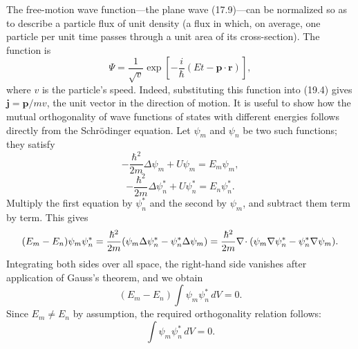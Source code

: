 The free-motion wave function---the plane wave (17.9)---can be normalized so
as to describe a particle flux of unit density (a flux in which, on average,
one particle per unit time passes through a unit area of its cross-section).
The function is
\begin{equation}
  \Psi=\frac{1}{\sqrt v}
  \exp\left[-\frac{i}{\hbar}(Et-\mathbf p\cdot\mathbf r)\right],
  \tag{19.7}
\end{equation}
where $v$ is the particle's speed. Indeed, substituting this function into
(19.4) gives $\mathbf j=\mathbf p/mv$, the unit vector in the direction of
motion.
It is useful to show how the mutual orthogonality of wave functions of states
with different energies follows directly from the Schrödinger equation. Let
$\psi_m$ and $\psi_n$ be two such functions; they satisfy
\[
  -\frac{\hbar^2}{2m}\Delta\psi_m+U\psi_m=E_m\psi_m,
\]
\[
  -\frac{\hbar^2}{2m}\Delta\psi_n^*+U\psi_n^*=E_n\psi_n^*.
\]
Multiply the first equation by $\psi_n^*$ and the second by $\psi_m$, and
subtract them term by term. This gives
\[
  (E_m-E_n)\psi_m\psi_n^*
  =\frac{\hbar^2}{2m}(\psi_m\Delta\psi_n^*-\psi_n^*\Delta\psi_m)
  =\frac{\hbar^2}{2m}\nabla\!\cdot 
  (\psi_m\nabla \psi_n^*-\psi_n^*\nabla \psi_m).
\]
Integrating both sides over all space, the right-hand side vanishes after
application of Gauss's theorem, and we obtain
\[
  (E_m-E_n)\int\psi_m\psi_n^*\,dV=0.
\]
Since $E_m\ne E_n$ by assumption, the required orthogonality relation follows:
\[
  \int\psi_m\psi_n^*\,dV=0.
\]
